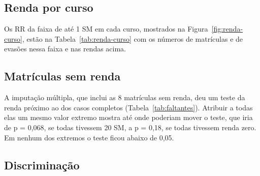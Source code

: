 \documentclass[12pt,a4paper]{article}
\newcommand{\tabela}[1]{\sbox\caixatabela{}%
  \ifdim\wd\caixatabela>\linewidth \resizebox{\linewidth}{!}{\usebox\caixatabela}%
  \else\ifdim\dimexpr\ht\caixatabela+\dp\caixatabela\relax>0.80\textheight
    \resizebox*{!}{0.80\textheight}{\usebox\caixatabela}%
  \else\usebox\caixatabela\fi\fi}
\begin{document}
\begin{table}[H]
  \centering
  \caption[Teste global da renda e AIC segundo a forma da renda]{Teste global da renda e AIC (verossimilhança de Bernoulli) segundo a forma da renda no modelo principal.}
  \label{tab:renda-formas}
  \tabela{tab_tcc_renda_formas.tex}
\end{table}

\subsection*{Renda por curso}

Os RR da faixa de até 1 SM em cada curso, mostrados na Figura~\ref{fig:renda-curso}, estão na Tabela~\ref{tab:renda-curso} com os números de matrículas e de evasões nessa faixa e nas rendas acima.

\begin{table}[H]
  \centering
  \caption[Risco relativo da renda de até 1 SM em cada curso (exploratório)]{RR de evasão no primeiro ano da renda familiar de até 1 SM em relação às rendas acima, em cada curso, no modelo principal com a renda trocada pela faixa de até 1 SM e a interação dessa faixa com o curso (exploratório; $n = 1{.}312$).}
  \label{tab:renda-curso}
  \tabela{tab_tcc_renda_curso.tex}
\end{table}

\subsection*{Matrículas sem renda}

A imputação múltipla, que inclui as 8 matrículas sem renda, deu um teste da renda próximo ao dos casos completos (Tabela~\ref{tab:faltantes}). Atribuir a todas elas um mesmo valor extremo mostra até onde poderiam mover o teste, que iria de p = 0,068, se todas tivessem 20 SM, a p = 0,18, se todas tivessem renda zero. Em nenhum dos extremos o teste ficou abaixo de 0,05.

\begin{table}[H]
  \centering
  \caption[Teste da renda segundo o tratamento das matrículas sem renda]{Teste global da renda segundo o tratamento das matrículas sem renda. A imputação usou 20 conjuntos e equações encadeadas, com teste combinado pela estatística $D_1$ \citep{li1991large}.}
  \label{tab:faltantes}
  \tabela{tab_tcc_faltantes.tex}
\end{table}


\subsection*{Discriminação}
\end{document}
